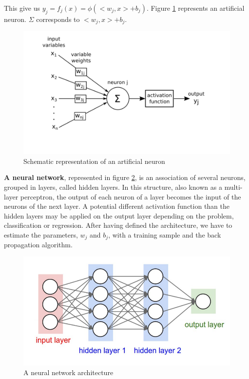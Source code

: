 This give us $y_j = f_j(x) = \phi ( <w_j , x> + b_j )$. Figure \ref{fig:neuron} represents an artificial neuron. $\Sigma$ corresponds to $<w_j,x> + b_j$. 

\begin{figure}[H]
    \centering
    \includegraphics{Graph/neuron.png}
    \caption{Schematic representation of an artificial neuron
}
    \label{fig:neuron}
\end{figure}



\textbf{A neural network}, represented in figure \ref{fig:neural_network}, is an association of several neurons, grouped in layers, called hidden layers. In this structure, also known as a multi-layer perceptron, the output of each neuron of a layer becomes the input of the neurons of the next layer. A potential different activation function than the hidden layers may be applied on the output layer depending on the problem, classification or regression. After having defined the architecture, we have to estimate the parameters, $w_j$ and $b_j$, with a training sample and the back propagation algorithm. 
\begin{figure}[H]
    \centering
    \includegraphics[scale = 0.7]{Graph/neural_net.png}
    \caption{A neural network architecture}
    \label{fig:neural_network}
\end{figure}

